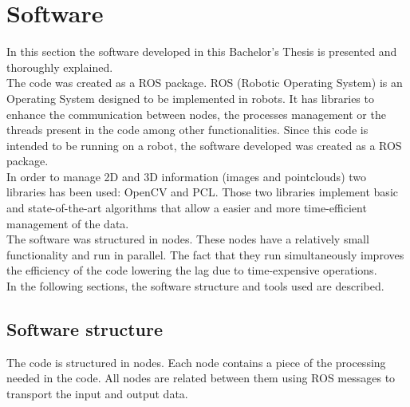 \chapter*{Software}

In this section the software developed in this Bachelor's Thesis is presented and thoroughly explained. 
\\

The code was created as a ROS package. ROS (Robotic Operating System) is an Operating System designed to be implemented in robots. It has libraries to enhance the communication between nodes, the processes management or the threads present in the code among other functionalities. 
Since this code is intended to be running on a robot, the software developed was created as a ROS package. 
\\

In order to manage 2D and 3D information (images and pointclouds) two libraries has been used: OpenCV and PCL. Those two libraries implement basic and state-of-the-art algorithms that allow a easier and more time-efficient management of the data. 
\\

The software was structured in nodes. These nodes have a relatively small functionality and run in parallel. The fact that they run simultaneously improves the efficiency of the code lowering the lag due to time-expensive operations. 
\\

In the following sections, the software structure and tools used are described. 


\newpage

\section*{Software structure}


The code is structured in nodes. Each node contains a piece of the processing needed in the code. All nodes are related between them using ROS messages to transport the input and output data. 
\\


